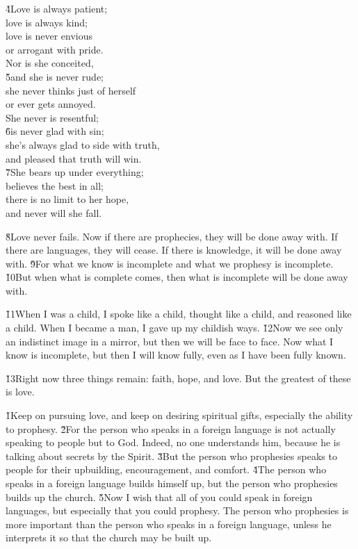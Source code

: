 \begin{poetry}
\poeml \v{4}Love is always patient; \\
\poemll    love is always kind; \\
\poeml love is never envious \\
\poemll    or arrogant with pride. \\
\poeml Nor is she conceited, \\
\poeml \v{5}and she is never rude; \\
\poeml she never thinks just of herself \\
\poemll    or ever gets annoyed. \\
\poeml She never is resentful; \\
\poeml \v{6}is never glad with sin; \\
\poeml she's always glad to side with truth, \\
\poemll    and pleased that truth will win. \\
\poeml \v{7}She bears up under everything; \\
\poemll    believes the best in all; \\
\poeml there is no limit to her hope, \\
\poemll    and never will she fall.
\end{poetry}

\v{8}Love never fails. Now if there are prophecies, they will be done away with. If there are languages, they will cease. If there is knowledge, it will be done away with. \v{9}For what we know is incomplete and what we prophesy is incomplete. \v{10}But when what is complete comes, then what is incomplete will be done away with.

\v{11}When I was a child, I spoke like a child, thought like a child, and reasoned like a child. When I became a man, I gave up my childish ways. \v{12}Now we see only an indistinct image in a mirror, but then we will be face to face. Now what I know is incomplete, but then I will know fully, even as I have been fully known.

\v{13}Right now three things remain: faith, hope, and love. But the greatest of these is love.

\v{1}Keep on pursuing love, and keep on desiring spiritual gifts, especially the ability to prophesy. \v{2}For the person who speaks in a foreign language is not actually speaking to people but to God. Indeed, no one understands him, because he is talking about secrets by the Spirit. \v{3}But the person who prophesies speaks to people for their upbuilding, encouragement, and comfort. \v{4}The person who speaks in a foreign language builds himself up, but the person who prophesies builds up the church. \v{5}Now I wish that all of you could speak in foreign languages, but especially that you could prophesy. The person who prophesies is more important than the person who speaks in a foreign language, unless he interprets it so that the church may be built up.

